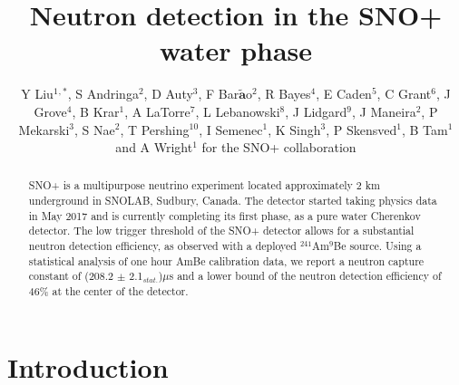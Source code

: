 \documentclass[a4paper]{jpconf}
\begin{document}
\title{Neutron detection in the SNO+ water phase}

\author{Y Liu$^1$$^{,\ast}$, S Andringa$^2$, D Auty$^3$, F Bar$\tilde{\textbf{a}}$o$^2$, R Bayes$^4$, E Caden$^5$, C Grant$^6$, J Grove$^4$, B Krar$^1$, A LaTorre$^7$, L Lebanowski$^8$, J Lidgard$^9$, J Maneira$^2$, P Mekarski$^3$, S Nae$^2$, T Pershing$^{10}$, I Semenec$^1$, K Singh$^3$, P Skensved$^1$, B Tam$^1$ and A Wright$^1$ for the SNO+ collaboration}

\address{$^1$ Queen's University, Department of Physics, Engineering Physics \& Astronomy, Kingston ON K7L 3N6, Canada}
\address{$^2$ Laborat\'{o}rio de Instrumenta{\c c}$\tilde{a}$o e F{\'{i}}sica Experimental de Part{\'{i}}culas, Av. Prof. Gama Pinto, 2, 1649-003, Lisbon, Portugal}
\address{$^3$ University of Alberta, Department of Physics, 4-181 CCIS, Edmonton, AB T6G 2E, Canada}
\address{$^4$ Laurentian University, 935 Ramsey Lake Road, Sudbury, ON P3E 2C6, Canada}
\address{$^5$ SNOLAB, Creighton Mine \#9, 1039 Regional Road 24, Sudbury, ON P3Y 1N2, Canada}
\address{$^6$ Boston University, Department of Physics, Boston, MA 02215, USA}
\address{$^7$ University of Chicago, Department of Physics, Chicago, IL 60637, USA}
\address{$^8$ University of Pennsylvania, Department of Physics \& Astronomy, Philadelphia, PA 19104-6396, USA}
\address{$^9$ University of Oxford, The Denys Wilkinson Building, Keble Road, Oxford, OX1 3RH, UK}
\address{$^{10}$ University of California, 1 Shields Avenue, Davis, CA 95616, USA}


\begin{abstract}
SNO+ is a multipurpose neutrino experiment located approximately 2 km underground in SNOLAB, Sudbury, Canada. The detector started taking physics data in May 2017 and is currently completing its first phase, as a pure water Cherenkov detector. The low trigger threshold of the SNO+ detector allows for a substantial neutron detection efficiency, as observed with a deployed $^{241}$Am$^{9}$Be source. Using a statistical analysis of one hour AmBe calibration data, we report a neutron capture constant of (208.2 $\pm$ 2.1$_{\textit{stat.}}$)$\mu$s and a lower bound of the neutron detection efficiency of 46\% at the center of the detector.
\end{abstract}

\section{Introduction}
\end{document}
